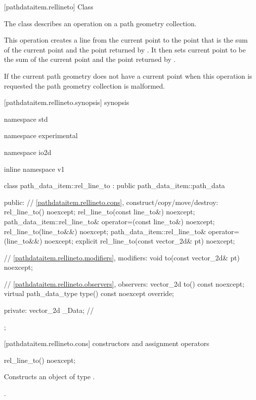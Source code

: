  [pathdataitem.rellineto] {Class }

\pnum
{}
The class  describes an operation on a path geometry collection.

\pnum
This operation creates a line from the current point to the point that is the sum of the current point and the point returned by . It then sets current point to be the sum of the current point and the point returned by .

\pnum
If the current path geometry does not have a current point when this operation is requested the path geometry collection is malformed.

 [pathdataitem.rellineto.synopsis] { synopsis}

\begin{codeblock}
namespace std { namespace experimental { namespace io2d { inline namespace v1 {
  class path_data_item::rel_line_to : public path_data_item::path_data {
  public:
    // \ref{pathdataitem.rellineto.cons}, construct/copy/move/destroy:
    rel_line_to() noexcept;
    rel_line_to(const line_to&) noexcept;
    path_data_item::rel_line_to& operator=(const line_to&) noexcept;
    rel_line_to(line_to&&) noexcept;
    path_data_item::rel_line_to& operator=(line_to&&) noexcept;
    explicit rel_line_to(const vector_2d& pt) noexcept;

    // \ref{pathdataitem.rellineto.modifiers}, modifiers:
    void to(const vector_2d& pt) noexcept;

    // \ref{pathdataitem.rellineto.observers}, observers:
    vector_2d to() const noexcept;
    virtual path_data_type type() const noexcept override;
    
  private:
    vector_2d _Data; // \expos
  };
} } } }
\end{codeblock}

 [pathdataitem.rellineto.cons] { constructors and assignment operators}

\begin{itemdecl}
    rel_line_to() noexcept;
\end{itemdecl}
\begin{itemdescr}
	\pnum
	\effects
	Constructs an object of type .
	
	\pnum
	\postconditions
	.
\end{itemdescr}

